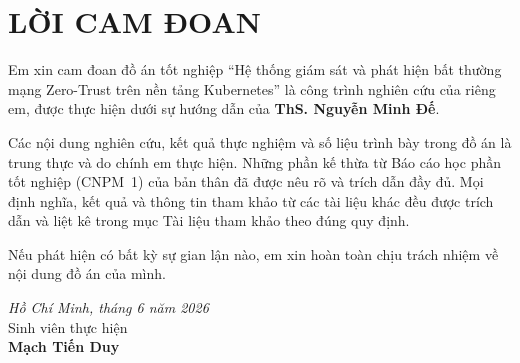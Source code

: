 \chapter*{LỜI CAM ĐOAN}

Em xin cam đoan đồ án tốt nghiệp ``Hệ thống giám sát và phát hiện bất thường mạng
Zero-Trust trên nền tảng Kubernetes'' là công trình nghiên cứu của riêng em, được thực
hiện dưới sự hướng dẫn của \textbf{ThS. Nguyễn Minh Đế}.

Các nội dung nghiên cứu, kết quả thực nghiệm và số liệu trình bày trong đồ án là trung
thực và do chính em thực hiện. Những phần kế thừa từ Báo cáo học phần tốt nghiệp (CNPM~1)
của bản thân đã được nêu rõ và trích dẫn đầy đủ. Mọi định nghĩa, kết quả và thông tin tham
khảo từ các tài liệu khác đều được trích dẫn và liệt kê trong mục Tài liệu tham khảo theo
đúng quy định.

Nếu phát hiện có bất kỳ sự gian lận nào, em xin hoàn toàn chịu trách nhiệm về nội dung đồ
án của mình.

\vspace{1cm}
\hfill\begin{minipage}{0.5\textwidth}
\centering
\textit{Hồ Chí Minh, tháng 6 năm 2026}\\[12pt]
Sinh viên thực hiện\\[24pt]
\textbf{Mạch Tiến Duy}
\end{minipage}
